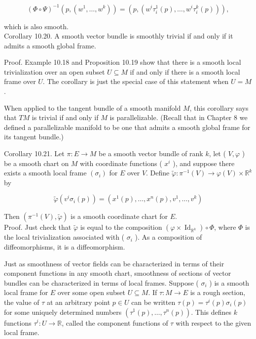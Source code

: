 \documentclass[10pt]{article}
\begin{document}
$$
(\Phi \circ \Psi)^{-1}\left(p,\left(w^{1}, \ldots, w^{k}\right)\right)=\left(p,\left(w^{i} \tau_{i}^{1}(p), \ldots, w^{i} \tau_{i}^{k}(p)\right)\right),
$$

which is also smooth.\\
Corollary 10.20. A smooth vector bundle is smoothly trivial if and only if it admits a smooth global frame.

Proof. Example 10.18 and Proposition 10.19 show that there is a smooth local trivialization over an open subset $U \subseteq M$ if and only if there is a smooth local frame over $U$. The corollary is just the special case of this statement when $U=M$.

When applied to the tangent bundle of a smooth manifold $M$, this corollary says that $T M$ is trivial if and only if $M$ is parallelizable. (Recall that in Chapter 8 we\\
defined a parallelizable manifold to be one that admits a smooth global frame for its tangent bundle.)

Corollary 10.21. Let $\pi: E \rightarrow M$ be a smooth vector bundle of rank $k$, let ( $V, \varphi$ ) be a smooth chart on $M$ with coordinate functions ( $x^{i}$ ), and suppose there exists a smooth local frame $\left(\sigma_{i}\right)$ for $E$ over $V$. Define $\tilde{\varphi}: \pi^{-1}(V) \rightarrow \varphi(V) \times \mathbb{R}^{k}$ by

$$
\widetilde{\varphi}\left(v^{i} \sigma_{i}(p)\right)=\left(x^{1}(p), \ldots, x^{n}(p), v^{1}, \ldots, v^{k}\right)
$$

Then $\left(\pi^{-1}(V), \widetilde{\varphi}\right)$ is a smooth coordinate chart for $E$.\\
Proof. Just check that $\widetilde{\varphi}$ is equal to the composition $\left(\varphi \times \operatorname{Id}_{\mathbb{R}^{k}}\right) \circ \Phi$, where $\Phi$ is the local trivialization associated with ( $\sigma_{i}$ ). As a composition of diffeomorphisms, it is a diffeomorphism.

Just as smoothness of vector fields can be characterized in terms of their component functions in any smooth chart, smoothness of sections of vector bundles can be characterized in terms of local frames. Suppose ( $\sigma_{i}$ ) is a smooth local frame for $E$ over some open subset $U \subseteq M$. If $\tau: M \rightarrow E$ is a rough section, the value of $\tau$ at an arbitrary point $p \in U$ can be written $\tau(p)=\tau^{i}(p) \sigma_{i}(p)$ for some uniquely determined numbers $\left(\tau^{1}(p), \ldots, \tau^{n}(p)\right)$. This defines $k$ functions $\tau^{i}: U \rightarrow \mathbb{R}$, called the component functions of $\tau$ with respect to the given local frame.
\end{document}
